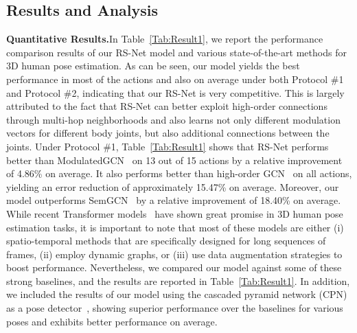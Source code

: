 \documentclass[10pt,journal]{IEEEtran}
\begin{document}
\subsection{Results and Analysis}
\noindent\textbf{Quantitative Results.}\quad In Table~\ref{Tab:Result1}, we report the performance comparison results of our RS-Net model and various state-of-the-art methods for 3D human pose estimation. As can be seen, our model yields the best performance in most of the actions and also on average under both Protocol \#1 and Protocol \#2, indicating that our RS-Net is very competitive. This is largely attributed to the fact that RS-Net can better exploit high-order connections through multi-hop neighborhoods and also learns not only different modulation vectors for different body joints, but also additional connections between the joints. Under Protocol \#1, Table~\ref{Tab:Result1} shows that RS-Net performs better than ModulatedGCN~\cite{zou2021modulated} on 13 out of 15 actions by a relative improvement of 4.86\% on average. It also performs better than high-order GCN~\cite{zou2020high} on all actions, yielding an error reduction of approximately 15.47\% on average. Moreover, our model outperforms SemGCN~\cite{zhao2019semantic} by a relative improvement of 18.40\% on average. While recent Transformer models~\cite{Weixi2021GraFormer,PoseFormer:2021,Zhang2022Aware,Jinlu2022Mix,Kevin2021End} have shown great promise in 3D human pose estimation tasks, it is important to note that most of these models are either (i) spatio-temporal methods that are specifically designed for long sequences of frames, (ii) employ dynamic graphs, or (iii) use data augmentation strategies to boost performance. Nevertheless, we compared our model against some of these strong baselines, and the results are reported in Table~\ref{Tab:Result1}. In addition, we included the results of our model using the cascaded pyramid network (CPN) as a pose detector~\cite{chen2018cascaded}, showing superior performance over the baselines for various poses and exhibits better performance on average.
\end{document}
